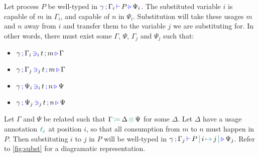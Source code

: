 \begin{nitheorem}
  \label{thm:substitution-generalization}
  Let process $P$ be well-typed in $\types{\gamma}{\Gamma_i}{P}{\Psi_i}$.
  The substituted variable $i$ is capable of $m$ in $\Gamma_i$, and capable of $n$ in $\Psi_i$.
  Substitution will take these usages $m$ and $n$ away from $i$ and transfer them to the variable $j$ we are substituting for.
  In other words, there must exist some $\Gamma$, $\Psi$, $\Gamma_j$ and $\Psi_j$ such that:
  \begin{multicols}{2}
  \begin{itemize}
    \item $\contains{\gamma}{\Gamma_i}{i}{t}{m}{\Gamma}$
    \item $\contains{\gamma}{\Gamma_j}{j}{t}{m}{\Gamma}$
    \item $\contains{\gamma}{\Psi_i}{i}{t}{n}{\Psi}$
    \item $\contains{\gamma}{\Psi_j}{j}{t}{n}{\Psi}$
  \end{itemize}
  \end{multicols}
  Let $\Gamma$ and $\Psi$ be related such that $\opctx{\Gamma}{\Delta}{\Psi}$ for some $\Delta$.
  Let $\Delta$ have a usage annotation $\lz$ at position $i$, so that all consumption from $m$ to $n$ must happen in $P$.
  Then substituting $i$ to $j$ in $P$ will be well-typed in $\types{\gamma}{\Gamma_j}{\subst{P}{j}{i}}{\Psi_j}$.
  Refer to \autoref{fig:subst} for a diagramatic representation.
\end{nitheorem}

